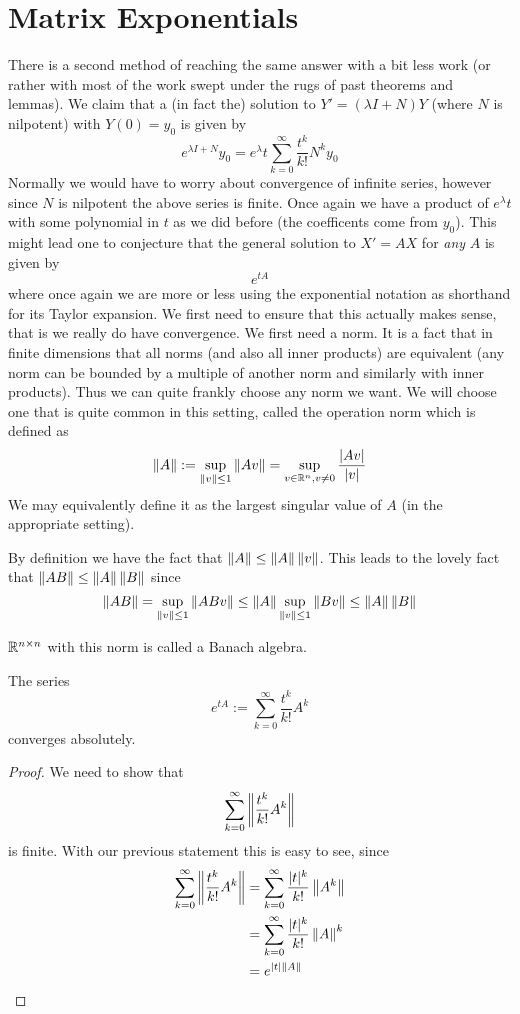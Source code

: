 \section{Matrix Exponentials}
There is a second method of reaching the same answer with a bit less work (or rather with most of the work swept under the rugs of past theorems and lemmas). We claim that a (in fact the) solution to $Y' = (\lambda I + N)Y$ (where $N$ is nilpotent) with $Y(0)=  y_0$ is given by
$$e^{\lambda I  + N}y_0 = e^\lambda t \sum_{k = 0}^{\infty} \frac{t^k}{k!} N^k y_0$$
Normally we would have to worry about convergence of infinite series, however since $N$ is nilpotent the above series is finite. Once again we have a product of $e^\lambda t$ with some polynomial in $t$ as we did before (the coefficents come from $y_0$). This might lead one to conjecture that the general solution to $X' = AX$ for \textit{any} $A$ is given by
$$e^{tA}$$
where once again we are more or less using the exponential notation as shorthand for its Taylor expansion. We first need to ensure that this actually makes sense, that is we really do have convergence. We first need a norm. It is a fact that in finite dimensions that all norms (and also all inner products) are equivalent (any norm can be bounded by a multiple of another norm and similarly with inner products). Thus we can quite frankly choose any norm we want. We will choose one that is quite common in this setting, called the operation norm which is defined as
$$ \left\lVert A\right\rVert := \sup_{\left\lVert v\right\rVert \leq 1} \left\lVert Av\right\rVert = \sup_{v \in \mathbb{R}^n, v\neq 0} \frac{|Av|}{|v|} $$
We may equivalently define it as the largest singular value of $A$ (in the appropriate setting).

By definition we have the fact that $\left\lVert A\right\rVert \leq \left\lVert A\right\rVert \left\lVert v\right\rVert$. This leads to the lovely fact that $\left\lVert AB\right\rVert \leq \left\lVert A\right\rVert \left\lVert B\right\rVert$ since
$$ \left\lVert AB\right\rVert = \sup_{\left\lVert v\right\rVert \leq 1} \left\lVert ABv\right\rVert \leq \left\lVert A\right\rVert \sup_{\left\lVert v\right\rVert \leq 1} \left\lVert Bv\right\rVert \leq \left\lVert A\right\rVert \left\lVert B\right\rVert $$
\begin{remark}
$\mathbb{R}^{n \times n}$ with this norm is called a Banach algebra.
\end{remark}

\begin{proposition}
The series
$$ e^{tA} := \sum_{k = 0}^{\infty} \frac{t^k}{k!} A^k $$
converges absolutely.
\end{proposition}
\begin{proof}
We need to show that
$$ \sum_{k = 0}^{\infty} \left\lVert \frac{t^k}{k!} A^k \right\rVert $$
is finite. With our previous statement this is easy to see, since
\begin{align*}
    \sum_{k = 0}^{\infty} \left\lVert \frac{t^k}{k!} A^k \right\rVert &= \sum_{k = 0}^{\infty} \frac{|t|^k}{k!} \left\lVert A^k\right\rVert\\
    &= \sum_{k = 0}^{\infty} \frac{|t|^k}{k!} \left\lVert A\right\rVert^k\\
    &= e^{|t| \left\lVert A\right\rVert}
\end{align*}
\end{proof}

